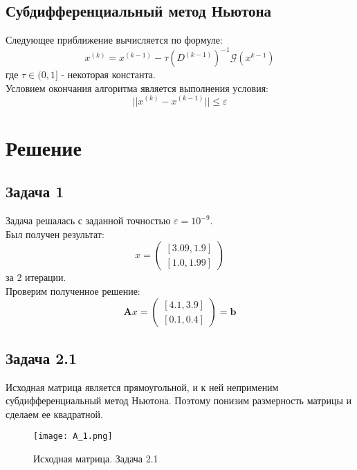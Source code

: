 \subsection{Субдифференциальный метод Ньютона}
Следующее приближение вычисляется по формуле:
\begin{equation}
	x^{(k)} = x^{(k - 1)} - \tau (D^{(k-1)})^{-1} \mathcal{G}(x^{k - 1})
\end{equation}
где $\tau \in (0,1]$ - некоторая константа. \\

Условием окончания алгоритма является выполнения условия:
\begin{equation}
	||x^{(k)} - x^{(k - 1)}|| \leq \varepsilon
\end{equation}


\section{Решение}
\subsection{Задача 1}
Задача решалась с заданной точностью $\varepsilon=10^{-9}$. \\

Был получен результат:
\begin{equation}
	x =
	\begin{pmatrix}
		[3.09, 1.9] \\
		[1.0, 1.99]
	\end{pmatrix}
\end{equation}
за 2 итерации. \\

Проверим полученное решение:
\begin{equation}
	\textbf{A}x =
	\begin{pmatrix}
		[4.1, 3.9] \\
		[0.1, 0.4]
	\end{pmatrix} = \textbf{b}
\end{equation}

\subsection{Задача 2.1}
Исходная матрица является прямоугольной, и к ней неприменим субдифференциальный метод Ньютона. Поэтому понизим размерность матрицы и сделаем ее квадратной. \\

\begin{figure}[h]
	\centering
	\texttt{[image: A\_1.png]}
	\caption{Исходная матрица. Задача 2.1}
\end{figure}

